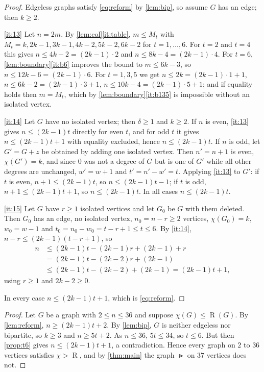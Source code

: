 \documentclass[11pt,a4paper]{article}
\theoremstyle{plain}
\theoremstyle{definition}
\theoremstyle{remark}
\newcommand{\RHS}{\operatorname{R}}
\begin{document}
\label{pf:t6}
\propsix*
\begin{proof}
Edgeless graphs satisfy \eqref{eq:reform} by \cref{lem:bip}, so assume $G$ has an edge; then $k\ge2$.

\ref{it:13} Let $n=2m$. By \cref{lem:col}\ref{it:table}, $m\le M_t$ with $M_t=k,2k-1,3k-1,4k-2,5k-2,6k-2$ for $t=1,\dots,6$. For $t=2$ and $t=4$ this gives $n\le4k-2=(2k-1)\cdot2$ and $n\le8k-4=(2k-1)\cdot4$. For $t=6$, \cref{lem:boundary}\ref{it:b6} improves the bound to $m\le6k-3$, so $n\le12k-6=(2k-1)\cdot6$. For $t=1,3,5$ we get $n\le2k=(2k-1)\cdot1+1$, $n\le6k-2=(2k-1)\cdot3+1$, $n\le10k-4=(2k-1)\cdot5+1$; and if equality holds then $m=M_t$, which by \cref{lem:boundary}\ref{it:b135} is impossible without an isolated vertex.

\ref{it:14} Let $G$ have no isolated vertex; then $\delta\ge1$ and $k\ge2$. If $n$ is even, \ref{it:13} gives $n\le(2k-1)t$ directly for even $t$, and for odd $t$ it gives $n\le(2k-1)t+1$ with equality excluded, hence $n\le(2k-1)t$. If $n$ is odd, let $G'=G+z$ be obtained by adding one isolated vertex. Then $n'=n+1$ is even, $\chi(G')=k$, and since $0$ was not a degree of $G$ but is one of $G'$ while all other degrees are unchanged, $w'=w+1$ and $t'=n'-w'=t$. Applying \ref{it:13} to $G'$: if $t$ is even, $n+1\le(2k-1)t$, so $n\le(2k-1)t-1$; if $t$ is odd, $n+1\le(2k-1)t+1$, so $n\le(2k-1)t$. In all cases $n\le(2k-1)t$.

\ref{it:15} Let $G$ have $r\ge1$ isolated vertices and let $G_0$ be $G$ with them deleted. Then $G_0$ has an edge, no isolated vertex, $n_0=n-r\ge2$ vertices, $\chi(G_0)=k$, $w_0=w-1$ and $t_0=n_0-w_0=t-r+1\le t\le6$. By \ref{it:14}, $n-r\le(2k-1)(t-r+1)$, so
\begin{align*}
n
&\le(2k-1)t-(2k-1)r+(2k-1)+r\\
&=(2k-1)t-(2k-2)r+(2k-1)\\
&\le(2k-1)t-(2k-2)+(2k-1)=(2k-1)t+1,
\end{align*}
using $r\ge1$ and $2k-2\ge0$.

In every case $n\le(2k-1)t+1$, which is \eqref{eq:reform}.
\end{proof}

\label{pf:min}
\thmmin*
\begin{proof}
Let $G$ be a graph with $2\le n\le36$ and suppose $\chi(G)\le\RHS(G)$. By \cref{lem:reform}, $n\ge(2k-1)t+2$. By \cref{lem:bip}, $G$ is neither edgeless nor bipartite, so $k\ge3$ and $n\ge5t+2$. As $n\le36$, $5t\le34$, so $t\le6$. But then \cref{prop:t6} gives $n\le(2k-1)t+1$, a contradiction. Hence every graph on $2$ to $36$ vertices satisfies $\chi>\RHS$, and by \cref{thm:main} the graph $\Gt$ on $37$ vertices does not.
\end{proof}
\end{document}
